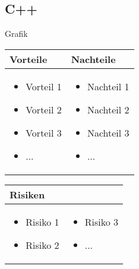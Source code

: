 \pagebreak


\subsection{C++}
Grafik

\begin{table}[h]
\begin{tabular}{p{} | p{}}


 \textbf{Vorteile} & \textbf{Nachteile} \\ \hline
	 
\begin{itemize}
\item Vorteil 1
\item Vorteil 2
\item Vorteil 3
\item ...
\end{itemize}

 
 &
 
\begin{itemize}
\item Nachteil 1
\item Nachteil 2
\item Nachteil 3
\item ...
\end{itemize}

\end{tabular}
\end{table}

\begin{table}[h]
\begin{tabular}{p{}p{}}


 \textbf{Risiken} & \\ \hline
	 
\begin{itemize}
\item Risiko 1
\item Risiko 2
\end{itemize}
&
\begin{itemize}
\item Risiko 3
\item ...
\end{itemize}

 
\end{tabular}
\end{table}

\pagebreak